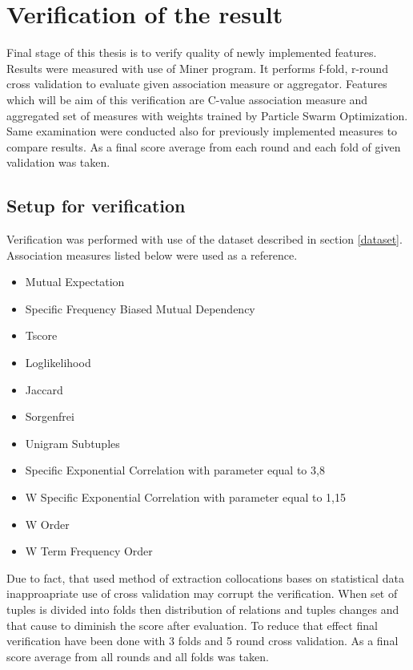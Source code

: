 \chapter{Verification of the result} \label{verification}

Final stage of this thesis is to verify quality of newly implemented features. Results were measured with use of Miner program. 
It performs f-fold, r-round cross validation to evaluate given association measure or aggregator. Features which will be aim of 
this verification are C-value association measure and aggregated set of measures with weights trained by Particle Swarm Optimization. 
Same examination were conducted also for previously implemented measures to compare results. As a final score average from each round 
and each fold of given validation was taken.

\section{Setup for verification}
Verification was performed with use of the dataset described in section \ref{dataset}. Association measures listed below 
were used as a reference.
\begin{itemize}
    \setlength\itemsep{0em}
    \item Mutual Expectation
    \item Specific Frequency Biased Mutual Dependency
    \item Tscore
    \item Loglikelihood
    \item Jaccard
    \item Sorgenfrei
    \item Unigram Subtuples
    \item Specific Exponential Correlation with parameter equal to 3,8
    \item W Specific Exponential Correlation with parameter equal to 1,15
    \item W Order
    \item W Term Frequency Order
\end{itemize}

Due to fact, that used method of extraction collocations bases on statistical data inapproapriate use of cross validation 
may corrupt the verification. When set of tuples is divided into folds then distribution of relations and tuples 
changes and that cause to diminish the score after evaluation. To reduce that effect final verification 
have been done with 3 folds and 5 round cross validation. As a final score average from all rounds and all folds was taken.

